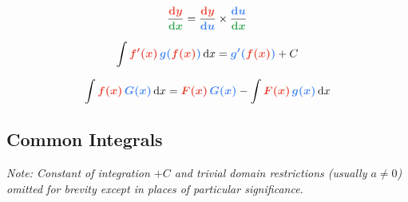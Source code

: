 \begin{multicols}{2}
\begin{CheatsheetEntryFrame}
        \begin{equation*}
            \frac{\memphR{\diff{y}}}{\memphG{\diff{x}}}
                = \frac{\memphR{\diff{y}}}{\memphB{\diff{u}}} \times \frac{\memphB{\diff{u}}}{\memphG{\diff{x}}}
        \end{equation*}

    \end{CheatsheetEntryFrame}

    \begin{CheatsheetEntryFrame}

        \begin{equation*}
            \int{\memphR{f'(x)} \, \memphB{g(}\memphR{f(x)}\memphB{)} \,\diff{x}}
                = \memphB{g'(}\memphR{f(x)}\memphB{)} + C
        \end{equation*}

        \begin{equation*}
            \int{\memphR{f(x)} \, \memphB{G(x)} \,\diff{x}}
            = \memphR{F(x)} \, \memphB{G(x)} - \int{\memphR{F(x)} \, \memphB{g(x)} \,\diff{x}}
        \end{equation*}

    \end{CheatsheetEntryFrame}

    \MulticolsBreak

    \MulticolsPhantomPlaceholder

\end{multicols}



\newpage
\subsection{Common Integrals}%
\label{sub:common-integrals}

{\color{extranotecolor} \textit{Note: Constant of integration $+C$ and trivial domain restrictions (usually $a \ne 0$) omitted for brevity except in places of particular significance.} }

\vspace*{-\parskip} 
\vspace*{-\abovedisplayskip}


